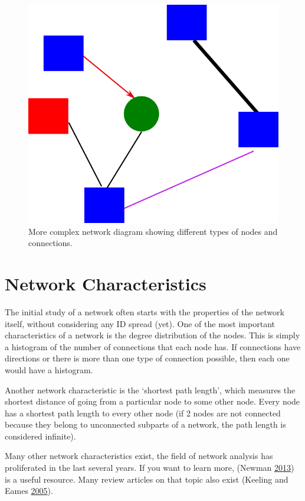 \documentclass[]{book}
\theoremstyle{definition}
\theoremstyle{definition}
\theoremstyle{definition}
\theoremstyle{remark}
\begin{document}
\begin{figure}
\centering
\includegraphics{./images/complex-network-diagram.png}
\caption{More complex network diagram showing different types of nodes
and connections.}
\end{figure}

\section{Network Characteristics}\label{network-characteristics}

The initial study of a network often starts with the properties of the
network itself, without considering any ID spread (yet). One of the most
important characteristics of a network is the degree distribution of the
nodes. This is simply a histogram of the number of connections that each
node has. If connections have directions or there is more than one type
of connection possible, then each one would have a histogram.

Another network characteristic is the `shortest path length', which
measures the shortest distance of going from a particular node to some
other node. Every node has a shortest path length to every other node
(if 2 nodes are not connected because they belong to unconnected
subparts of a network, the path length is considered infinite).

Many other network characteristics exist, the field of network analysis
has proliferated in the last several years. If you want to learn more,
(Newman \protect\hyperlink{ref-newman13}{2013}) is a useful resource.
Many review articles on that topic also exist (Keeling and Eames
\protect\hyperlink{ref-keeling05}{2005}).
\end{document}
